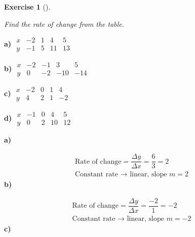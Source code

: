 \documentclass[
  letterpaper,
  DIV=11,
  numbers=noendperiod]{scrreprt}
\theoremstyle{definition}
\newtheorem{exercise}{Exercise}[chapter]
\theoremstyle{remark}
\begin{document}
\begin{exercise}[]\protect\hypertarget{exr-u7-11}{}\label{exr-u7-11}

\emph{Find the rate of change from the table.}

\textbf{a)}
\(\displaystyle \begin{array}{c|cccc} x & -2 & 1 & 4 & 5 \\ \hline y & -1 & 5 & 11 & 13 \end{array}\)

\textbf{b)}
\(\displaystyle \begin{array}{c|cccc} x & -2 & -1 & 3 & 5 \\ \hline y & 0 & -2 & -10 & -14 \end{array}\)

\textbf{c)}
\(\displaystyle \begin{array}{c|cccc} x & -2 & 0 & 1 & 4 \\ \hline y & 4 & 2 & 1 & -2 \end{array}\)

\textbf{d)}
\(\displaystyle \begin{array}{c|cccc} x & -1 & 0 & 4 & 5 \\ \hline y & 0 & 2 & 10 & 12 \end{array}\)

\begin{tcolorbox}[enhanced jigsaw, opacitybacktitle=0.6, coltitle=black, arc=.35mm, colframe=quarto-callout-tip-color-frame, colback=white, bottomrule=.15mm, left=2mm, colbacktitle=quarto-callout-tip-color!10!white, titlerule=0mm, opacityback=0, title=\textcolor{quarto-callout-tip-color}{\faLightbulb}\hspace{0.5em}{🔍 View Solutions}, leftrule=.75mm, breakable, rightrule=.15mm, bottomtitle=1mm, toptitle=1mm, toprule=.15mm]

\textbf{a)}

\[
\begin{aligned}
\text{Rate of change} = \dfrac{\Delta y}{\Delta x} = \dfrac{6}{3} = 2 \\[4pt] \text{Constant rate → linear, slope } m = 2
\end{aligned}
\] \textbf{b)}

\[
\begin{aligned}
\text{Rate of change} = \dfrac{\Delta y}{\Delta x} = \dfrac{-2}{1} = -2 \\[4pt] \text{Constant rate → linear, slope } m = -2
\end{aligned}
\] \textbf{c)}


\end{tcolorbox}
\end{exercise}
\end{document}
